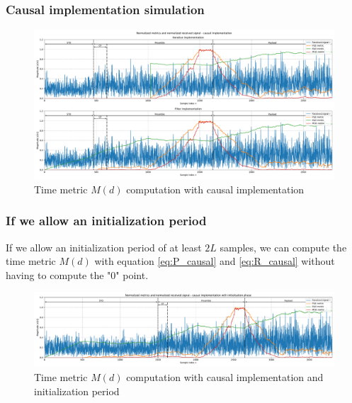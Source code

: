 \documentclass[10pt]{beamer}
\begin{document}
\begin{frame}
    \frametitle{Causal implementation simulation}
    \begin{figure}
        \centering
        \includegraphics[width=\textwidth]{schmidl_cox_plots/metrics_causal.pdf}
        \caption{Time metric $M(d)$ computation with causal implementation}
    \end{figure}
\end{frame}

\begin{frame}
    \frametitle{If we allow an initialization period}
    If we allow an initialization period of at least $2L$ samples, we can compute the time metric $M(d)$ with equation \ref{eq:P_causal} and \ref{eq:R_causal} without having to compute the "$0$" point.

    \begin{figure}
        \centering
        \includegraphics[width=\textwidth]{schmidl_cox_plots/metrics_causal_initialisation.pdf}
        \caption{Time metric $M(d)$ computation with causal implementation and initialization period}      
    \end{figure}
\end{frame}
\end{document}
